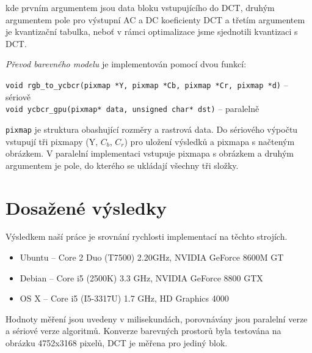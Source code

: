 \documentclass[11pt,a4paper]{article}
\begin{document}
kde prvním argumentem jsou data bloku vstupujícího do DCT, druhým argumentem pole pro výstupní AC a DC koeficienty DCT
a třetím argumentem je kvantizační tabulka, neboť v rámci optimalizace jsme sjednotili kvantizaci s DCT.

\textit{Převod barevného modelu} je implementován pomocí dvou funkcí:

\vspace{0.5em}
\hspace{-1.5em}\texttt{void rgb\_to\_ycbcr(pixmap *Y, pixmap *Cb, pixmap *Cr, pixmap *d)} -- sériově\\
\texttt{void ycbcr\_gpu(pixmap* data, unsigned char* dst)} -- paralelně
\vspace{0.5em}

\texttt{pixmap} je struktura obashující rozměry a rastrová data. Do sériového výpočtu vstupují tři pixmapy (Y, $C_b$, $C_r$) pro uložení výsledků a pixmapa s načteným obrázkem. V paralelní implementaci vstupuje pixmapa s obrázkem a druhým argumentem je pole, do kterého se ukládají všechny tři složky. 

\section{Dosažené výsledky}
Výsledkem naší práce je srovnání rychlosti implementací na těchto strojích.
\begin{itemize}
\item Ubuntu -- Core 2 Duo (T7500) 2.20GHz, NVIDIA GeForce 8600M GT
\item Debian -- Core i5 (2500K) 3.3 GHz, NVIDIA GeForce 8800 GTX
\item OS X -- Core i5 (I5-3317U) 1.7 GHz, HD Graphics 4000
\end{itemize}
Hodnoty měření jsou uvedeny v milisekundách, porovnávány jsou paralelní verze a sériové verze algoritmů.
Konverze barevných prostorů byla testována na obrázku 4752x3168 pixelů, DCT je měřena pro jediný blok.
\end{document}
